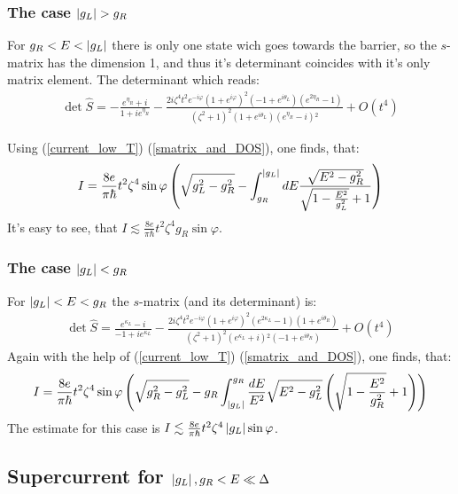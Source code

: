 \subsubsection{The case $ \left|g_L\right| > g_R $}

For $ g_R<E<\left|g_L\right| $ there is only one state wich goes towards the barrier, so the $ s $-matrix has the dimension 1, and thus it's determinant coincides with it's only matrix element. The determinant which reads:
\begin{gather}
	\det \hat{S}
	=
	-\frac{e^{\eta _R}+i}{1+i e^{\eta _R}}-\frac{2 i \zeta ^4 t^2 e^{-i \varphi } \left(1+e^{i \varphi }\right)^2 \left(-1+e^{i \theta _L}\right) \left(e^{2 \eta _R}-1\right)}{\left(\zeta ^2+1\right)^2 \left(1+e^{i \theta _L}\right) \left(e^{\eta _R}-i\right){}^2}+O\left(t^4\right)
\end{gather}

Using (\ref{current_low_T}) (\ref{smatrix_and_DOS}), one finds, that:
\begin{gather}
\label{curr_e_between_g_r>g_l}
	I=
	\frac{8e}{\pi\hbar}t^2\zeta^4\sin\varphi
	\left(
		\sqrt{g_L^2-g_R^2}
		-
		\int_{g_R}^{\left|g_L\right|}	dE\frac{\sqrt{E^2-g_R^2}}{ \sqrt{1-\frac{E^2}{g_L^2}}+1}\right)
\end{gather}
It's easy to see, that $ I\lesssim 	\frac{8e}{\pi\hbar}t^2\zeta^4 g_{R}\sin\varphi  $.
\subsubsection{The case $ \left|g_L\right| < g_R $}
For $ \left|g_L\right|<E<g_R $  the $ s $-matrix (and its determinant) is:
\begin{gather}
\det\hat{S}
=
	\frac{e^{\kappa _L}-i}{-1+i e^{\kappa _L}}-\frac{2 i \zeta ^4 t^2 e^{-i \varphi } \left(1+e^{i \varphi }\right)^2 \left(e^{2 \kappa _L}-1\right) \left(1+e^{i \theta _R}\right)}{\left(\zeta ^2+1\right)^2 \left(e^{\kappa _L}+i\right){}^2 \left(-1+e^{i \theta _R}\right)}+O\left(t^4\right)
\end{gather}
Again with the help of (\ref{current_low_T}) (\ref{smatrix_and_DOS}), one finds, that:
\begin{gather}
\label{curr_e_between_g_r<g_l}
I=
\frac{8e}{\pi\hbar}t^2\zeta^4
\sin \varphi
\left(
	\sqrt{g_R^2-g_L^2}
	-
	g_R
	\int_{\left|g_L\right|}^{g_R}
	\frac{dE}{E^2}
	\sqrt{E^2-g_L^2} \left(\sqrt{1-\frac{E^2}{g_R^2}}+1\right)
\right)
\end{gather}
The estimate for this case is $ I\lesssim 	\frac{8e}{\pi\hbar}t^2\zeta^4 \left|g_{L}\right|\sin\varphi  $.
\subsection{Supercurrent for $  \left|g_L\right|, g_R<E\ll\Delta $ }


